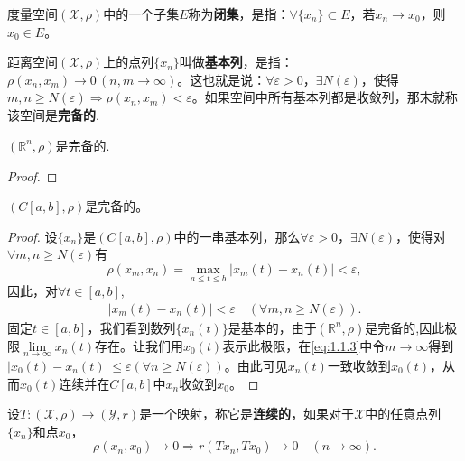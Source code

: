 \documentclass[../../main.tex]{subfiles}
\begin{document}
\begin{definition}
度量空间$(\mathscr{X},\rho)$中的一个子集$E$称为\textbf{闭集}，是指：$\forall \{x_n\} \subset E$，若$x_n \to x_0$，则$x_0 \in E$。
\end{definition}

\begin{definition}
距离空间$(\mathscr{X},\rho)$上的点列$\{x_n\}$叫做\textbf{基本列}，是指：$\rho(x_n,x_m) \to 0\,(n,m \to \infty)$。这也就是说：$\forall \varepsilon > 0$，$\exists N(\varepsilon)$，使得$m,n \geqslant N(\varepsilon) \Rightarrow \rho(x_n,x_m) < \varepsilon$。如果空间中所有基本列都是收敛列，那末就称该空间是\textbf{完备的}.
\end{definition}

\begin{example}
$(\mathbb{R}^n,\rho)$是完备的.
\end{example}
\begin{proof}


\end{proof}

\begin{example}
$(C[a,b],\rho)$是完备的。
\end{example}
\begin{proof}
设$\{x_n\}$是$(C[a,b],\rho)$中的一串基本列，那么$\forall \varepsilon>0$，$\exists N(\varepsilon)$，使得对$\forall m,n\geqslant N(\varepsilon)$有
$$\rho(x_m,x_n)=\max_{a\leqslant t\leqslant b}|x_m(t)-x_n(t)|<\varepsilon,$$
因此，对$\forall t\in [a,b]$,
\begin{align}
\label{eq:1.1.3}
|x_m(t)-x_n(t)|<\varepsilon \quad (\forall m,n\geqslant N(\varepsilon)).
\end{align}
固定$t\in [a,b]$，我们看到数列$\{x_n(t)\}$是基本的，由于$(\mathbb{R}^n,\rho)$是完备的,因此极限$\lim\limits_{n\to \infty} x_n(t)$存在。让我们用$x_0(t)$表示此极限，在\eqref{eq:1.1.3}中令$m\to \infty$得到$|x_0(t)-x_n(t)|\leqslant \varepsilon (\forall n\geqslant N(\varepsilon))$。由此可见$x_n(t)$一致收敛到$x_0(t)$，从而$x_0(t)$连续并在$C[a,b]$中$x_n$收敛到$x_0$。

\end{proof}

\begin{definition}
设$T: (\mathscr{X}, \rho) \to (\mathscr{Y}, r)$是一个映射，称它是\textbf{连续的}，如果对于$\mathscr{X}$中的任意点列$\{x_n\}$和点$x_0$，
$$\rho(x_n, x_0) \to 0 \Rightarrow r(Tx_n, Tx_0) \to 0 \quad (n \to \infty).$$
\end{definition}
\end{document}
